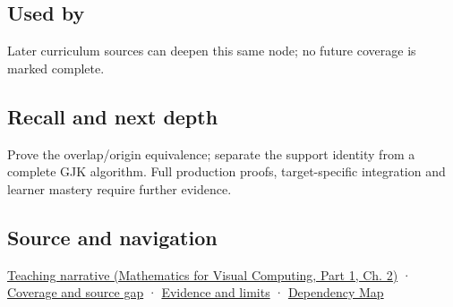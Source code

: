 \subsection{Used by}\label{appendix-215ac7099a82-used-by}

\hypertarget{appendix-215ac7099a82-used-by}{}

Later curriculum sources can deepen this same node; no future coverage is marked complete.

\subsection{Recall and next depth}\label{appendix-215ac7099a82-recall-and-next-depth}

\hypertarget{appendix-215ac7099a82-recall-and-next-depth}{}

Prove the overlap/origin equivalence; separate the support identity from a complete GJK algorithm. Full production proofs, target-specific integration and learner mastery require further evidence.

\subsection{Source and navigation}\label{appendix-215ac7099a82-source-and-navigation}

\hypertarget{appendix-215ac7099a82-source-and-navigation}{}

\href{../02-Mathematics-for-Visual-Computing-P01/main.pdf\#01-foundations-i-ch018-weighted-points-lead-from-affine-geometry-to-collision-shapes}{Teaching narrative (Mathematics for Visual Computing, Part 1, Ch. 2)} · \hyperref[appendix-fd090d982a15-phase-6---parts-501-600]{Coverage and source gap} · \hyperref[appendix-a103e7846d21-phase-6---source-analysis-and-verification]{Evidence and limits} · \hyperref[appendix-4ad47bdd269a]{Dependency Map}
